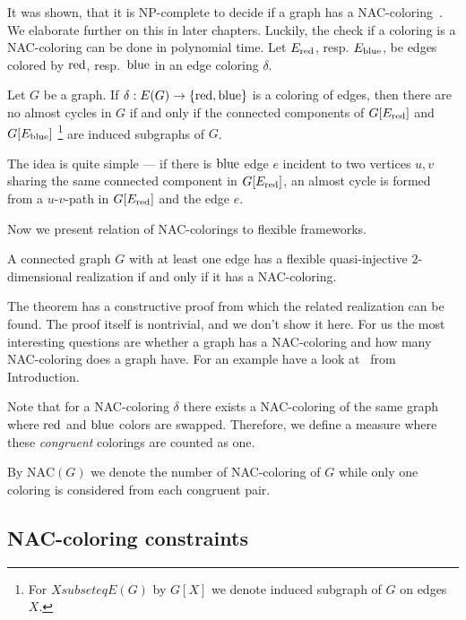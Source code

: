 It was shown, that it is NP-complete to decide if a graph has a NAC-coloring~\cite{np_complete}.
We elaborate further on this in later chapters.
Luckily, the check if a coloring is a NAC-coloring can be done in polynomial time.
Let \( E_{\text{red}}\), resp. \( E_{\text{blue}} \), be edges colored by \( \text{red} \), resp.~\( \text{blue} \)
in an edge coloring \( \delta \).
%
\begin{lemma}
	Let \( G \) be a graph. If \( \delta: E(G) \to \{ \text{red}, \text{blue} \} \) is a coloring of edges,
	then there are no almost cycles in \( G \) if and only if the connected components
	of \( G[E_{\text{red}}] \) and \( G[E_{\text{blue}}] \)%
	\footnote{For \(X subseteq E(G)\) by \(G[X]\) we denote induced subgraph of \( G \) on edges \( X \).}
	are induced subgraphs of \( G \).
\end{lemma}
%
The idea is quite simple --- if there is \WLOG{} \( \text{blue} \) edge \( e \) incident to
two vertices \( u, v \) sharing the same connected component in \( G[E_{\text{red}}] \),
an almost cycle is formed from a \( u \)-\( v \)-path in \( G[E_{\text{red}}] \)
and the edge \( e \).

Now we present relation of NAC-colorings to flexible frameworks.
%
\begin{theorem}
	A connected graph \( G \) with at least one edge has a flexible
	quasi-injective \( 2 \)-dimensional realization if and only if it has a NAC-coloring.
\end{theorem}
%
The theorem has a constructive proof from which the related realization can be found.
The proof itself is nontrivial, and we don't show it here.
For us the most interesting questions are whether a graph has a NAC-coloring
and how many NAC-coloring does a graph have.
For an example have a look at~
from Introduction.

Note that for a NAC-coloring \( \delta \) there exists a NAC-coloring of the same
graph where \( \text{red} \) and \( \text{blue} \) colors are swapped.
Therefore, we define a measure where these \emph{congruent} colorings are
counted as one.
%
\begin{definition}
	By \( \text{NAC}(G) \) we denote the number of NAC-coloring of \( G \)
	while only one coloring is considered from each congruent pair.
\end{definition}
%

\subsection{NAC-coloring constraints}

